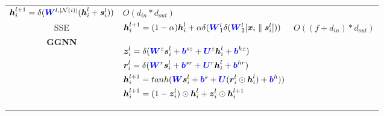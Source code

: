 \begin{table}
\begin{footnotesize}
\begin{tabular}{cp{20em}r}
			$\boldsymbol{h}_i^{l+1} = \delta(\textcolor{blue}{\boldsymbol{W}}^{l, |\mathcal{N}(i)|}  (\boldsymbol{h}_i^l + \boldsymbol{s}_i^{l}))$                                                                           &
			$O(d_{in} * d_{out})$                                                                                                                                                                                              \\
			SSE                                                                                                                                                                                                              &
			$\boldsymbol{h}_i^{l+1} = (1 - \alpha)  \boldsymbol{h}_i^l +\alpha    \delta(\textcolor{blue}{\boldsymbol{W}}^l_1 \delta(\textcolor{blue}{\boldsymbol{W}}^l_2 [\boldsymbol{x}_i \parallel \boldsymbol{s}_i^l]))$ &
			$O((f + d_{in}) * d_{out})$                                                                                                                                                                                        \\
			\textbf{GGNN}                                                                                                                                                                                                    &
			\begin{scriptsize}
				$\begin{aligned}[t]
						 & {\boldsymbol{z}}_i^l = \delta ( \textcolor{blue}{\boldsymbol{W}}^z \boldsymbol{s}_i^l + \textcolor{blue}{\boldsymbol{b}}^{sz} + \textcolor{blue}{\boldsymbol{U}}^z \boldsymbol{h}_i^{l} + \textcolor{blue}{\boldsymbol{b}}^{hz})                    \\
						 & \boldsymbol{r}_i^l = \delta ( \textcolor{blue}{\boldsymbol{W}}^r \boldsymbol{s}_i^l+ \textcolor{blue}{\boldsymbol{b}}^{sr} +\textcolor{blue}{\boldsymbol{U}}^r \boldsymbol{h}_i^{l} + \textcolor{blue}{\boldsymbol{b}}^{hr})                        \\
						 & \boldsymbol{h}_i^{l+1} = tanh ( \textcolor{blue}{\boldsymbol{W}} \boldsymbol{s}_i^l + \textcolor{blue}{\boldsymbol{b}}^s + \textcolor{blue}{\boldsymbol{U}} ( \boldsymbol{r}_i^l \odot \boldsymbol{h}_i^{l}) + \textcolor{blue}{\boldsymbol{b}}^h)) \\
						 & \boldsymbol{h}_i^{l+1} = (1 - {\boldsymbol{z}}_i^l) \odot \boldsymbol{h}_i^l + {\boldsymbol{z}}_i^l \odot \boldsymbol{h}_i^{l+1}
					\end{aligned}$
			\end{scriptsize}

\end{tabular}
\end{footnotesize}
\end{table}
